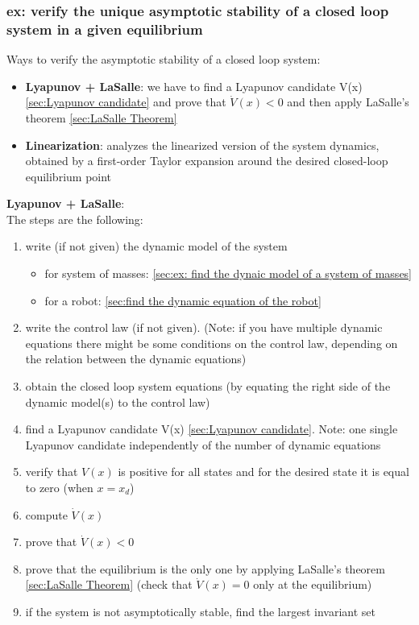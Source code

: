 \documentclass[a4paper,12pt]{article}
\begin{document}
\subsubsection{ex: verify the unique asymptotic stability of a closed loop
system in a given equilibrium}
Ways to verify the asymptotic stability of a
closed loop system:
\begin{itemize}
    \item \textbf{Lyapunov + LaSalle}: we have to find a Lyapunov
    candidate V(x) \ref{sec:Lyapunov candidate} and prove that $\dot{V}(x) < 0$ and then apply
    LaSalle's theorem \ref{sec:LaSalle Theorem}
    \item \textbf{Linearization}: analyzes the linearized version of the system
    dynamics, obtained by a first-order Taylor expansion around the desired closed-loop equilibrium
    point
\end{itemize}
\textbf{Lyapunov + LaSalle}:\\
The steps are the following:
\begin{enumerate}
    \item write (if not given) the dynamic model of the system 
    \begin{itemize}
        \item for system of masses: \ref{sec:ex: find the dynaic model of a system of masses}
        \item for a robot: \ref{sec:find the dynamic equation of the robot}
    \end{itemize}
    \item write the control law (if not given). (Note: if you have multiple
    dynamic equations there might be some conditions on the control law, depending
    on the relation between the dynamic equations)
    \item obtain the closed loop system equations (by 
    equating the right side of the dynamic model(s) to the control law)
    \item find a Lyapunov candidate V(x) \ref{sec:Lyapunov candidate}. 
    Note: one single Lyapunov candidate independently of 
    the number of dynamic equations
    \item verify that $V(x)$ is positive for all states and for 
    the desired state it is equal to zero (when $x = x_d$)
    \item compute $\dot{V}(x)$
    \item prove that $\dot{V}(x) < 0$
    \item prove that the equilibrium is the only one by applying
     LaSalle's theorem \ref{sec:LaSalle Theorem} (check that 
     $\dot{V}(x) = 0$ only at the equilibrium)
    \item if the system is not asymptotically stable, find the
    largest invariant set
\end{enumerate}
\end{document}
